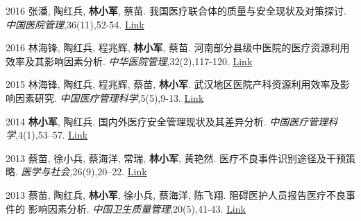 \documentclass[12pt,letterpaper]{report}
\begin{document}
\begin{tablist}
		\item[2016]  \tab  张潘, 陶红兵,  \textbf{林小军}, 蔡苗. 我国医疗联合体的质量与安全现状及对策探讨. \emph{中国医院管理},36(11),52-54. \href{http://kns.cnki.net/KCMS/detail/detail.aspx?dbcode=CJFQ&dbname=CJFDLAST2016&filename=YYGL201611027&v=MjM5Mjl1WnNGaXZtVTcvS1BEVE1Zckc0SDlmTnJvOUhZNFI4ZVgxTHV4WVM3RGgxVDNxVHJXTTFGckNVUkxLZVo=}{Link}\\[5pt]

		\item[2016]  \tab  林海锋, 陶红兵, 程兆辉, \textbf{林小军}, 蔡苗. 河南部分县级中医院的医疗资源利用效率及其影响因素分析. \emph{中华医院管理},32(2),117-120. \href{http://www.wanfangdata.com.cn/details/detail.do?_type=perio&id=zhyygl201602013}{Link}\\[5pt]

		\item[2015]  \tab  林海锋, 陶红兵, 程兆辉, 蔡苗, \textbf{林小军}. 武汉地区医院产科资源利用效率及影响因素研究. \emph{中国医疗管理科学},5(5),9-13. \href{http://kns.cnki.net/KCMS/detail/detail.aspx?dbcode=CJFQ&dbname=CJFDLAST2015&filename=YLGL201505004&v=MjkxODIxTHV4WVM3RGgxVDNxVHJXTTFGckNVUkxLZVp1WnNGaXZtVkx2QVBDSE1Zckc0SDlUTXFvOUZZSVI4ZVg=}{Link}\\[5pt]
		
		\item[2014]  \tab  \textbf{林小军}, 陶红兵. 国内外医疗安全管理现状及其差异分析. \emph{中国医疗管理科学},4(1),53–57. \href{https://kns.cnki.net/kcms/detail/detail.aspx?filename=YLGL201401019&dbcode=CJFQ&dbname=CJFD2014&v=}{Link}\\[5pt]

		\item[2013]  \tab  蔡苗, 徐小兵, 蔡海洋, 常瑞, \textbf{林小军}, 黄艳然. 医疗不良事件识别途径及干预策略. \emph{医学与社会},26(9),20–22. \href{http://kns.cnki.net/KCMS/detail/detail.aspx?dbcode=CJFQ&dbname=CJFDHIS2&filename=YXSH201309007&v=MDAwNDFyQ1VSTEtlWnVac0Zpdm1XcnZOUERYWVpyRzRIOUxNcG85Rlk0UjhlWDFMdXhZUzdEaDFUM3FUcldNMUY=}{Link}\\[5pt]

		\item[2013]  \tab  蔡苗, 陶红兵, \textbf{林小军}, 徐小兵, 蔡海洋, 陈飞翔. 阻碍医护人员报告医疗不良事件的 影响因素分析. \emph{中国卫生质量管理},20(5),41-43. \href{http://kns.cnki.net/KCMS/detail/detail.aspx?dbcode=CJFQ&dbname=CJFDHIS2&filename=WSJG201305024&v=Mjc4MDIxTHV4WVM3RGgxVDNxVHJXTTFGckNVUkxLZVp1WnNGaXZuVXJ6Tk1qN0JhYkc0SDlMTXFvOUhZSVI4ZVg=}{Link}\\	

 \end{tablist}
\end{document}
